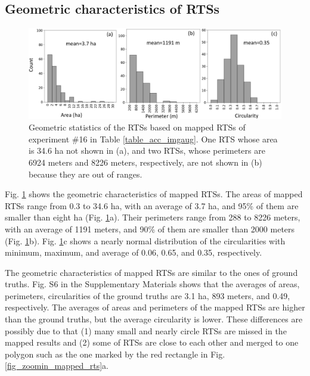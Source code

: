 \documentclass[preprint,12pt,authoryear]{elsarticle}
\begin{document}
\subsection{Geometric characteristics of RTSs}
\label{subsec_geo_charac}

\begin{figure}
	\centering
	\includegraphics[width=14cm]{figures/geometric_var_mapped_trim.jpg}
	\caption{Geometric statistics of the RTSs based on mapped RTSs of experiment \#16 in Table \ref{table_acc_imgaug}. One RTS whose area is 34.6 ha not shown in (a), and two RTSs, whose perimeters are 6924 meters and 8226 meters, respectively, are not shown in (b) because they are out of ranges. }
	\label{fig_geometric_statistics}
\end{figure}


Fig. \ref{fig_geometric_statistics} shows the geometric characteristics of mapped RTSs.  The areas of mapped RTSs range from 0.3 to 34.6 ha, with an average of 3.7 ha, and 95\% of them are smaller than eight ha (Fig. \ref{fig_geometric_statistics}a). Their perimeters range from 288 to 8226 meters, with an average of 1191 meters, and 90\% of them are smaller than 2000 meters (Fig. \ref{fig_geometric_statistics}b). Fig. \ref{fig_geometric_statistics}c shows a nearly normal distribution of the circularities with minimum, maximum, and average of 0.06, 0.65, and 0.35, respectively. 

The geometric characteristics of mapped RTSs are similar to the ones of ground truths. Fig. S6 in the Supplementary Materials shows that the averages of areas, perimeters, circularities of the ground truths 
 are 3.1 ha, 893 meters, and 0.49, respectively. The averages of areas and perimeters of the mapped RTSs are higher than the ground truths, but the average circularity is lower. These differences are possibly due to that (1) many small and nearly circle RTSs are missed in the mapped results and (2) some of RTSs are close to each other and merged to one polygon such as the one marked by the red rectangle in Fig. \ref{fig_zoomin_mapped_rts}a.  
\end{document}

